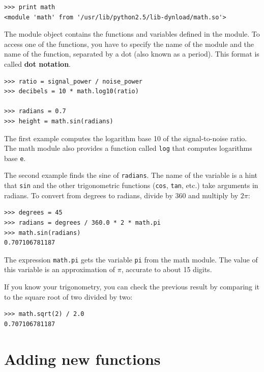 \documentclass[10pt]{book}
\begin{document}
\beforeverb
\begin{verbatim}
>>> print math
<module 'math' from '/usr/lib/python2.5/lib-dynload/math.so'>
\end{verbatim}
\afterverb
%
The module object contains the functions and variables defined in the
module.  To access one of the functions, you have to specify the name
of the module and the name of the function, separated by a dot (also
known as a period).  This format is called {\bf dot notation}.


\beforeverb
\begin{verbatim}
>>> ratio = signal_power / noise_power
>>> decibels = 10 * math.log10(ratio)

>>> radians = 0.7
>>> height = math.sin(radians)
\end{verbatim}
\afterverb
%
The first example computes the logarithm base 10 of the
signal-to-noise ratio.  The math module also provides a
function called {\tt log} that computes logarithms base {\tt e}.


The second example finds the sine of {\tt radians}.  The name of the
variable is a hint that {\tt sin} and the other trigonometric
functions ({\tt cos}, {\tt tan}, etc.)  take arguments in radians. To
convert from degrees to radians, divide by 360 and multiply by $2
\pi$:

\beforeverb
\begin{verbatim}
>>> degrees = 45
>>> radians = degrees / 360.0 * 2 * math.pi
>>> math.sin(radians)
0.707106781187
\end{verbatim}
\afterverb
%
The expression {\tt math.pi} gets the variable {\tt pi} from the math
module.  The value of this variable is an approximation
of $\pi$, accurate to about 15 digits.


If you know
your trigonometry, you can check the previous result by comparing it to
the square root of two divided by two:


\beforeverb
\begin{verbatim}
>>> math.sqrt(2) / 2.0
0.707106781187
\end{verbatim}
\afterverb
%

\section{Adding new functions}
\end{document}
